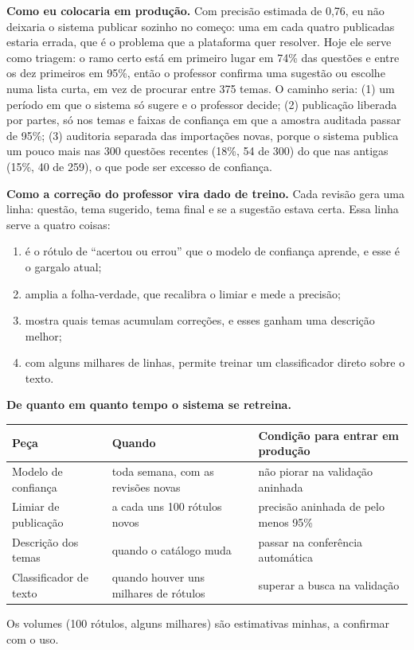 \documentclass[11pt,a4paper]{article}
\newcommand{\bd}[1]{\textbf{#1}}
\begin{document}
\bd{Como eu colocaria em produção.} Com precisão estimada de 0,76, eu não deixaria o sistema
publicar sozinho no começo: uma em cada quatro publicadas estaria errada, que é o problema que a
plataforma quer resolver. Hoje ele serve como triagem: o ramo certo está em primeiro lugar em 74\%
das questões e entre os dez primeiros em 95\%, então o professor confirma uma sugestão ou escolhe
numa lista curta, em vez de procurar entre 375 temas. O caminho seria: (1) um período em que o
sistema só sugere e o professor decide; (2) publicação liberada por partes, só nos temas e faixas
de confiança em que a amostra auditada passar de 95\%; (3) auditoria separada das importações
novas, porque o sistema publica um pouco mais nas 300 questões recentes (18\%, 54 de 300) do que
nas antigas (15\%, 40 de 259), o que pode ser excesso de confiança.

\bd{Como a correção do professor vira dado de treino.} Cada revisão gera uma linha: questão, tema
sugerido, tema final e se a sugestão estava certa. Essa linha serve a quatro coisas:
\begin{enumerate}
\item é o rótulo de ``acertou ou errou'' que o modelo de confiança aprende, e esse é o gargalo
      atual;
\item amplia a folha-verdade, que recalibra o limiar e mede a precisão;
\item mostra quais temas acumulam correções, e esses ganham uma descrição melhor;
\item com alguns milhares de linhas, permite treinar um classificador direto sobre o texto.
\end{enumerate}

\bd{De quanto em quanto tempo o sistema se retreina.}
\begin{center}
\small
\begin{tabular}{lll}
\toprule
Peça & Quando & Condição para entrar em produção \\
\midrule
Modelo de confiança & toda semana, com as revisões novas & não piorar na validação aninhada \\
Limiar de publicação & a cada uns 100 rótulos novos & precisão aninhada de pelo menos 95\% \\
Descrição dos temas & quando o catálogo muda & passar na conferência automática \\
Classificador de texto & quando houver uns milhares de rótulos & superar a busca na validação \\
\bottomrule
\end{tabular}
\end{center}
\vspace{-3pt}
{\small Os volumes (100 rótulos, alguns milhares) são estimativas minhas, a confirmar com o uso.}
\end{document}
